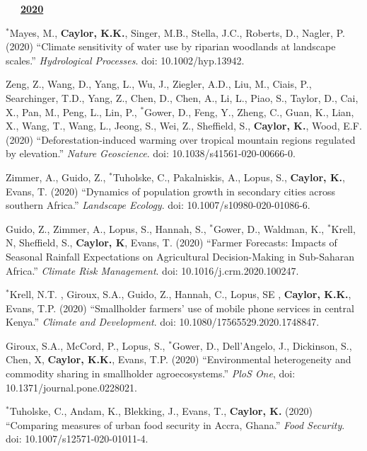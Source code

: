 \documentclass[10pt]{report}
\begin{document}
\begin{etaremune}
\mbox{\ \ \ \underline{\textbf{2020}}}

\item $^{*}$Mayes, M., \textbf{Caylor, K.K.}, Singer, M.B., Stella, J.C., Roberts, D., Nagler, P. (2020) ``Climate sensitivity of water use by riparian woodlands at landscape scales.'' {\em Hydrological Processes}. doi: 10.1002/hyp.13942.

\item Zeng, Z., Wang, D., Yang, L.,  Wu, J.,  Ziegler, A.D., Liu, M., Ciais, P., Searchinger, T.D., Yang, Z., Chen, D., Chen, A., Li, L., Piao, S., Taylor, D., Cai, X., Pan, M., Peng, L., Lin, P., $^{*}$Gower, D., Feng, Y.,  Zheng, C., Guan, K., Lian, X., Wang, T., Wang, L., Jeong, S., Wei, Z., Sheffield, S., \textbf{Caylor, K.}, Wood, E.F. (2020) ``Deforestation-induced warming over tropical mountain regions regulated by elevation.'' {\em Nature Geoscience}. doi: 10.1038/s41561-020-00666-0.
 
\item Zimmer, A., Guido, Z., $^{*}$Tuholske, C., Pakalniskis, A., Lopus, S., \textbf{Caylor, K.}, Evans, T. (2020) ``Dynamics of population growth in secondary cities across southern Africa.'' {\em Landscape Ecology}. doi: 10.1007/s10980-020-01086-6.

\item Guido, Z., Zimmer, A., Lopus, S., Hannah, S., $^{*}$Gower, D.,  Waldman, K., $^{*}$Krell, N, Sheffield, S., \textbf{Caylor, K},  Evans, T. (2020) ``Farmer Forecasts: Impacts of Seasonal Rainfall Expectations on Agricultural Decision-Making in Sub-Saharan Africa.'' {\em Climate Risk Management}. doi: 10.1016/j.crm.2020.100247.

\item  $^{*}$Krell, N.T. , Giroux, S.A., Guido, Z., Hannah, C., Lopus, SE , \textbf{Caylor, K.K.}, Evans, T.P. (2020) ``Smallholder farmers' use of mobile phone services in central Kenya.'' {\em Climate and Development}. doi: 10.1080/17565529.2020.1748847.

\item Giroux, S.A., McCord, P., Lopus, S., $^{*}$Gower, D., Dell’Angelo, J., Dickinson, S., Chen, X, \textbf{Caylor, K.K.}, Evans, T.P. (2020) ``Environmental heterogeneity and commodity sharing in smallholder agroecosystems.'' {\em PloS One}, doi: 10.1371/journal.pone.0228021.

\item  $^{*}$Tuholske, C., Andam, K., Blekking, J., Evans, T., \textbf{Caylor, K.} (2020) ``Comparing measures of urban food security in Accra, Ghana.'' {\em Food Security}. doi: 10.1007/s12571-020-01011-4.


\end{etaremune}
\end{document}
